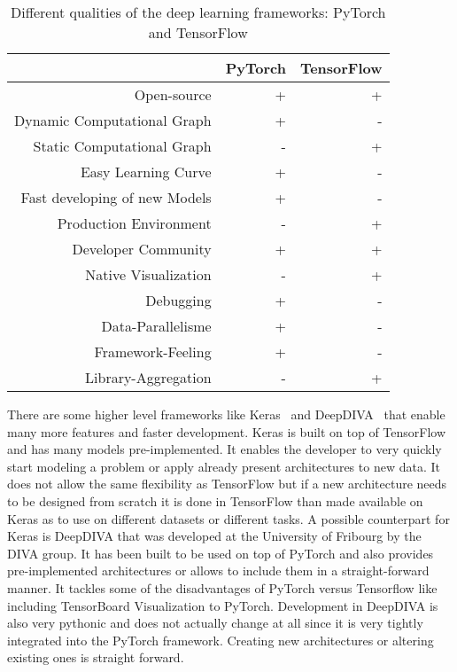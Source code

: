 \begin{table}[t] \centering
{}
\caption{Different qualities of the deep learning frameworks: PyTorch and TensorFlow}
\begin{tabular}{@{}rrr@{}}
\toprule & PyTorch & TensorFlow \\
\midrule
Open-source									& + & + \\
Dynamic Computational Graph			& + & -  \\
Static Computational Graph				& - & +  \\
Easy Learning Curve							& + & -  \\
Fast developing of new Models			& + & -  \\
Production Environment					& - & + \\
Developer Community						& + & + \\
Native Visualization							& - & +  \\
Debugging										& + & -  \\
Data-Parallelisme								& + & -  \\
Framework-Feeling							& + & -  \\
Library-Aggregation							& - & +  \\

\bottomrule
\end{tabular}
\label{tbl:DeepLearningFrameworks}
\end{table}

\quad

There are some higher level frameworks like Keras~\cite{keras} and DeepDIVA~\cite{deepdiva} that enable many more features and faster development. Keras is built on top of TensorFlow and has many models pre-implemented. It enables the developer to very quickly start modeling a problem or apply already present architectures to new data. It does not allow the same flexibility as TensorFlow but if a new architecture needs to be designed from scratch it is done in TensorFlow than made available on Keras as to use on different datasets or different tasks. A possible counterpart for Keras is DeepDIVA that was developed at the University of Fribourg by the DIVA group. It has been built to be used on top of PyTorch and also provides pre-implemented architectures or allows to include them in a straight-forward manner. It tackles some of the disadvantages of PyTorch versus Tensorflow like including TensorBoard Visualization to PyTorch. Development in DeepDIVA is also very pythonic and does not actually change at all since it is very tightly integrated into the PyTorch framework. Creating new architectures or altering existing ones is straight forward.\\


